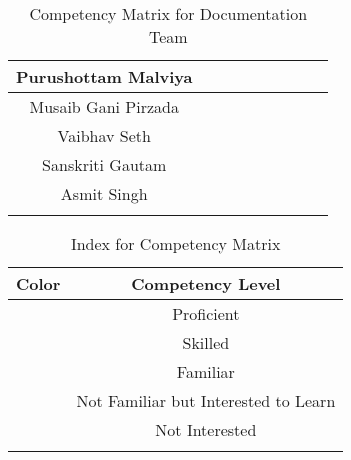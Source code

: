 \begin{center}
\begin{longtable}{|c|c|c|c|c|c|p{1.2cm}|c|c|}
Purushottam Malviya     & \cellcolor[HTML]{FFFF00} & \cellcolor[HTML]{FFFF00} & \cellcolor[HTML]{FFFF00} & \cellcolor[HTML]{FFC000} & \cellcolor[HTML]{D9D9D9} & \cellcolor[HTML]{D9D9D9} & \cellcolor[HTML]{D9D9D9} & \cellcolor[HTML]{FFC000} \\ \hline
Musaib Gani Pirzada     & \cellcolor[HTML]{00B050} & \cellcolor[HTML]{FFFF00} & \cellcolor[HTML]{FFFF00} & \cellcolor[HTML]{92D050} & \cellcolor[HTML]{FFFF00} & \cellcolor[HTML]{00B050} & \cellcolor[HTML]{FFC000} & \cellcolor[HTML]{FFC000} \\ \hline
Vaibhav Seth            & \cellcolor[HTML]{00B050} & \cellcolor[HTML]{92D050} & \cellcolor[HTML]{FFFF00} & \cellcolor[HTML]{92D050} & \cellcolor[HTML]{D9D9D9} & \cellcolor[HTML]{D9D9D9} & \cellcolor[HTML]{FFC000} & \cellcolor[HTML]{D9D9D9} \\ \hline
Sanskriti Gautam        & \cellcolor[HTML]{FFFF00} & \cellcolor[HTML]{92D050} & \cellcolor[HTML]{FFFF00} & \cellcolor[HTML]{FFFF00} & \cellcolor[HTML]{FFC000} & \cellcolor[HTML]{FFC000} & \cellcolor[HTML]{D9D9D9} & \cellcolor[HTML]{D9D9D9} \\ \hline
Asmit Singh             & \cellcolor[HTML]{92D050} & \cellcolor[HTML]{FFFF00} & \cellcolor[HTML]{00B050} & \cellcolor[HTML]{FFFF00} & \cellcolor[HTML]{D9D9D9} & \cellcolor[HTML]{D9D9D9} & \cellcolor[HTML]{D9D9D9} & \cellcolor[HTML]{D9D9D9} \\ \hline
\caption{Competency Matrix for Documentation Team}
\end{longtable}
\setlength\LTleft{0cm}
\end{center}

\begin{center}
\label{table:index_for_competency}
\begin{longtable}{|c|c|} \hline
Color                    & Competency Level                     \\ \hline
\cellcolor[HTML]{00B050}            & Proficient \\ \hline
\cellcolor[HTML]{92D050}            & Skilled \\ \hline
\cellcolor[HTML]{FFFF00}            & Familiar \\ \hline
\cellcolor[HTML]{FFC000}            & Not Familiar but Interested to Learn \\ \hline
\cellcolor[HTML]{D9D9D9}            & Not Interested \\ \hline
\caption{Index for Competency Matrix}
\end{longtable}
\end{center}



